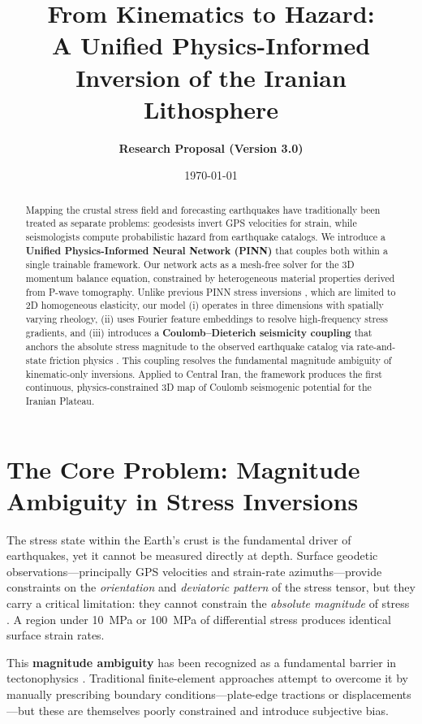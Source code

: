 \documentclass[11pt, a4paper]{article}
\title{\textbf{From Kinematics to Hazard: \\ A Unified Physics-Informed Inversion of the Iranian Lithosphere}}
\author{\textbf{Research Proposal (Version 3.0)}}
\date{\today}
\begin{document}
\maketitle

\begin{abstract}
Mapping the crustal stress field and forecasting earthquakes have traditionally been treated as separate problems: geodesists invert GPS velocities for strain, while seismologists compute probabilistic hazard from earthquake catalogs. We introduce a \textbf{Unified Physics-Informed Neural Network (PINN)} that couples both within a single trainable framework. Our network acts as a mesh-free solver for the 3D momentum balance equation, constrained by heterogeneous material properties derived from P-wave tomography. Unlike previous PINN stress inversions \cite{Masson2023}, which are limited to 2D homogeneous elasticity, our model (i) operates in three dimensions with spatially varying rheology, (ii) uses Fourier feature embeddings to resolve high-frequency stress gradients, and (iii) introduces a \textbf{Coulomb--Dieterich seismicity coupling} that anchors the absolute stress magnitude to the observed earthquake catalog via rate-and-state friction physics \cite{Dieterich1994}. This coupling resolves the fundamental magnitude ambiguity of kinematic-only inversions. Applied to Central Iran, the framework produces the first continuous, physics-constrained 3D map of Coulomb seismogenic potential for the Iranian Plateau.
\end{abstract}

\section{The Core Problem: Magnitude Ambiguity in Stress Inversions}

The stress state within the Earth's crust is the fundamental driver of earthquakes, yet it cannot be measured directly at depth. Surface geodetic observations---principally GPS velocities and strain-rate azimuths---provide constraints on the \textit{orientation} and \textit{deviatoric pattern} of the stress tensor, but they carry a critical limitation: they cannot constrain the \textit{absolute magnitude} of stress \cite{Khorrami2019}. A region under 10~MPa or 100~MPa of differential stress produces identical surface strain rates.

This \textbf{magnitude ambiguity} has been recognized as a fundamental barrier in tectonophysics \cite{Heidbach2018}. Traditional finite-element approaches \cite{Zamani2017, Rajabi2017} attempt to overcome it by manually prescribing boundary conditions---plate-edge tractions or displacements---but these are themselves poorly constrained and introduce subjective bias.
\end{document}
